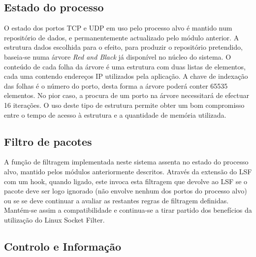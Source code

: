 \subsection*{Estado do processo}
\label{sub:data_repository}

O estado dos portos TCP e UDP em uso pelo processo alvo é mantido num repositório de dados, e permanentemente actualizado pelo módulo anterior. 
 A estrutura dados escolhida para o efeito, para produzir o repositório pretendido, baseia-se numa árvore \textit{Red and Black} já disponível no núcleo do sistema. O conteúdo de cada folha da árvore é uma estrutura com duas listas de elementos, cada uma contendo endereços IP utilizados pela aplicação. A chave de indexação das folhas é o número do porto, desta forma a árvore poderá conter 65535 elementos. No pior caso, a procura de um porto na árvore necessitará de efectuar 16 iterações.
  O uso deste tipo de estrutura permite obter um bom compromisso entre o tempo de acesso à estrutura e a quantidade de memória utilizada.


\subsection*{Filtro de pacotes}
\label{sub:packet_filter}

A função de filtragem  implementada neste sistema assenta no estado do processo alvo, mantido pelos módulos anteriormente descritos.
Através da extensão do LSF com um hook, quando ligado, este invoca esta filtragem que devolve ao LSF se o pacote deve ser logo ignorado (não envolve nenhum dos portos do processo alvo) ou se se deve continuar a avaliar as restantes regras de filtragem definidas. Mantém-se assim a compatibilidade e continua-se a tirar partido dos benefícios da utilização do Linux Socket Filter.



\subsection*{Controlo e Informação}
\label{sub:data_information}

